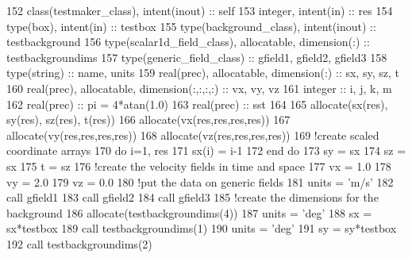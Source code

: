 \begin{DoxyCode}
152     \textcolor{keywordtype}{class}(testmaker\_class), \textcolor{keywordtype}{intent(inout)} :: self
153     \textcolor{keywordtype}{integer}, \textcolor{keywordtype}{intent(in)} :: res
154     \textcolor{keywordtype}{type}(box), \textcolor{keywordtype}{intent(in)} :: testbox
155     \textcolor{keywordtype}{type}(background\_class), \textcolor{keywordtype}{intent(inout)} :: testbackground
156     \textcolor{keywordtype}{type}(scalar1d\_field\_class), \textcolor{keywordtype}{allocatable}, \textcolor{keywordtype}{dimension(:)} :: testbackgroundims
157     \textcolor{keywordtype}{type}(generic\_field\_class) :: gfield1, gfield2, gfield3
158     \textcolor{keywordtype}{type}(string) :: name, units
159     \textcolor{keywordtype}{real(prec)}, \textcolor{keywordtype}{allocatable}, \textcolor{keywordtype}{dimension(:)} :: sx, sy, sz, t
160     \textcolor{keywordtype}{real(prec)}, \textcolor{keywordtype}{allocatable}, \textcolor{keywordtype}{dimension(:,:,:,:)} :: vx, vy, vz
161     \textcolor{keywordtype}{integer} :: i, j, k, m
162     \textcolor{keywordtype}{real(prec)} :: pi = 4*atan(1.0)
163     \textcolor{keywordtype}{real(prec)} :: sst
164 
165     \textcolor{keyword}{allocate}(sx(res), sy(res), sz(res), t(res))
166     \textcolor{keyword}{allocate}(vx(res,res,res,res))
167     \textcolor{keyword}{allocate}(vy(res,res,res,res))
168     \textcolor{keyword}{allocate}(vz(res,res,res,res))
169     \textcolor{comment}{!create scaled coordinate arrays}
170     \textcolor{keywordflow}{do} i=1, res
171         sx(i) = i-1
172 \textcolor{keywordflow}{    end do}
173     sy = sx
174     sz = sx
175     t = sz
176     \textcolor{comment}{!create the velocity fields in time and space}
177     vx = 1.0
178     vy = 2.0
179     vz = 0.0
180     \textcolor{comment}{!put the data on generic fields}
181     units = \textcolor{stringliteral}{'m/s'}
182     \textcolor{keyword}{call }gfield1%
183     \textcolor{keyword}{call }gfield2%
184     \textcolor{keyword}{call }gfield3%
185     \textcolor{comment}{!create the dimensions for the background}
186     \textcolor{keyword}{allocate}(testbackgroundims(4))
187     units = \textcolor{stringliteral}{'deg'}
188     sx = sx*testbox%
189     \textcolor{keyword}{call }testbackgroundims(1)%
190     units = \textcolor{stringliteral}{'deg'}
191     sy = sy*testbox%
192     \textcolor{keyword}{call }testbackgroundims(2)%

\end{DoxyCode}
